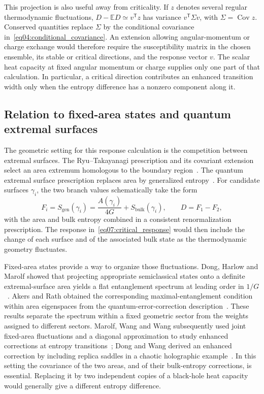 \documentclass[11pt,letterpaper]{article}
\newcommand{\E}{\mathbb{E}}
\DeclareMathOperator{\Cov}{Cov}
\theoremstyle{plain}
\theoremstyle{definition}
\theoremstyle{remark}
\begin{document}
This projection is also useful away from criticality. If $z$ denotes several regular thermodynamic fluctuations, $D-\E D\simeq v^{\mathsf T}z$ has variance $v^{\mathsf T}\Sigma v$, with $\Sigma=\Cov z$. Conserved quantities replace $\Sigma$ by the conditional covariance in~\eqref{eq04:conditional_covariance}. An extension allowing angular-momentum or charge exchange would therefore require the susceptibility matrix in the chosen ensemble, its stable or critical directions, and the response vector $v$. The scalar heat capacity at fixed angular momentum or charge supplies only one part of that calculation. In particular, a critical direction contributes an enhanced transition width only when the entropy difference has a nonzero component along it.

\subsection{Relation to fixed-area states and quantum extremal surfaces}
\label{sec07:gravity}

The geometric setting for this response calculation is the competition between extremal surfaces. The Ryu--Takayanagi prescription and its covariant extension select an area extremum homologous to the boundary region~\cite{ryutakayanagi2006,hubeny2007}. The quantum extremal surface prescription replaces area by generalized entropy~\cite{engelhardtwall2015}. For candidate surfaces $\gamma_i$, the two branch values schematically take the form
\begin{equation}
 F_i=S_{\mathrm{gen}}(\gamma_i)
 =\frac{A(\gamma_i)}{4G}+S_{\mathrm{bulk}}(\gamma_i),
 \qquad D=F_1-F_2,
 \label{eq07:generalized_difference}
\end{equation}
with the area and bulk entropy combined in a consistent renormalization prescription. The response in~\eqref{eq07:critical_response} would then include the change of each surface and of the associated bulk state as the thermodynamic geometry fluctuates.

Fixed-area states provide a way to organize those fluctuations. Dong, Harlow and Marolf showed that projecting appropriate semiclassical states onto a definite extremal-surface area yields a flat entanglement spectrum at leading order in $1/G$~\cite{dong2019}. Akers and Rath obtained the corresponding maximal-entanglement condition within area eigenspaces from the quantum-error-correction description~\cite{akers2019}. These results separate the spectrum within a fixed geometric sector from the weights assigned to different sectors. Marolf, Wang and Wang subsequently used joint fixed-area fluctuations and a diagonal approximation to study enhanced corrections at entropy transitions~\cite{marolfwangwang2020}; Dong and Wang derived an enhanced correction by including replica saddles in a chaotic holographic example~\cite{dongwang2020}. In this setting the covariance of the two areas, and of their bulk-entropy corrections, is essential. Replacing it by two independent copies of a black-hole heat capacity would generally give a different entropy difference.
\end{document}
